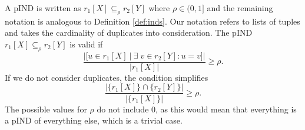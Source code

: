 


\begin{definition}\label{def:pinds}
    A pIND is written as $r_1[X] \subseteq_{\rho} r_2[Y]$ where $\rho \in (0, 1]$ and the remaining notation is analogous to Definition \ref{def:inds}. Our notation refers to lists of tuples and takes the cardinality of duplicates into consideration. The pIND $r_1[X] \subseteq_{\rho} r_2[Y]$ is valid if
    $$
        \frac{|[u \in r_1[X] \: | \: \exists \; v \in r_2[Y] : u = v]|}
            {|r_1[X]|} \geq \rho.
    $$
    If we do not consider duplicates, the condition simplifies
    $$
         \frac{|\{r_1[X]\} \cap \{r_2[Y]\}|}
            {|\{r_1[X]\}|} \geq \rho.
    $$
     The possible values for $\rho$ do not include $0$, as this would mean that everything is a pIND of everything else, which is a trivial case.
\end{definition}

